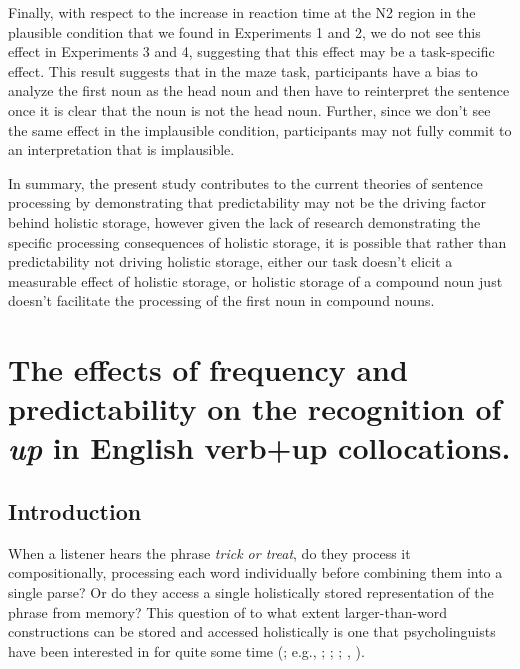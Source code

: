 \documentclass[
  12pt,
  letterpaper,
]{scrreprt}
\begin{document}
Finally, with respect to the increase in reaction time at the N2 region
in the plausible condition that we found in Experiments 1 and 2, we do
not see this effect in Experiments 3 and 4, suggesting that this effect
may be a task-specific effect. This result suggests that in the maze
task, participants have a bias to analyze the first noun as the head
noun and then have to reinterpret the sentence once it is clear that the
noun is not the head noun. Further, since we don't see the same effect
in the implausible condition, participants may not fully commit to an
interpretation that is implausible.

In summary, the present study contributes to the current theories of
sentence processing by demonstrating that predictability may not be the
driving factor behind holistic storage, however given the lack of
research demonstrating the specific processing consequences of holistic
storage, it is possible that rather than predictability not driving
holistic storage, either our task doesn't elicit a measurable effect of
holistic storage, or holistic storage of a compound noun just doesn't
facilitate the processing of the first noun in compound nouns.


\chapter{\texorpdfstring{The effects of frequency and predictability on
the recognition of \emph{up} in English verb+up
collocations.}{The effects of frequency and predictability on the recognition of up in English verb+up collocations.}}\label{the-effects-of-frequency-and-predictability-on-the-recognition-of-up-in-english-verbup-collocations.}

\section{Introduction}\label{introduction-2}

When a listener hears the phrase \emph{trick or treat}, do they process
it compositionally, processing each word individually before combining
them into a single parse? Or do they access a single holistically stored
representation of the phrase from memory? This question of to what
extent larger-than-word constructions can be stored and accessed
holistically is one that psycholinguists have been interested in for
quite some time (; e.g.,
;
;
; ,
).
\end{document}
